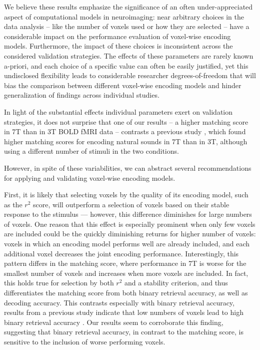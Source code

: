 We believe these results emphasize the significance of an often under-appreciated aspect of computational models in neuroimaging: near arbitrary choices in the data analysis -- like the number of voxels used or how they are selected -- have a considerable impact on the performance evaluation of voxel-wise encoding models. Furthermore, the impact of these choices is inconsistent across the considered validation strategies. The effects of these parameters are rarely known a-priori, and each choice of a specific value can often be easily justified, yet this undisclosed flexibility leads to considerable researcher degrees-of-freedom \citep{SNS11,hong2019false} that will bias the comparison between different voxel-wise encoding models and hinder generalization of findings across individual studies.

In light of the substantial effects individual parameters exert on validation strategies, it does not surprise that one of our results -- a higher matching score in 7T than in 3T BOLD fMRI data -- contrasts a  previous study \citep{SF14}, which found higher matching scores for encoding natural sounds in 7T than in 3T, although using a different number of stimuli in the two conditions.

However, in spite of these variabilities, we can abstract several recommendations for applying and validating voxel-wise encoding models.

First, it is likely that selecting voxels by the quality of its encoding model, such as the $r^{2}$ score, will outperform a selection of voxels based on their stable response to the stimulus --- however, this difference diminishes for large numbers of voxels. One reason that this effect is especially prominent when only few voxels are included could be the quickly diminishing returns for higher number of voxels: voxels in which  an encoding model performs well are already included, and each additional voxel decreases the joint encoding performance. Interestingly, this pattern differs in the matching score, where performance in 7T is worse for the smallest number of voxels and increases when more voxels are included. In fact, this holds true for selection by both $r^{2}$ and a stability criterion, and thus differentiates the matching score from both binary retrieval accuracy, as well as decoding accuracy. This contrasts especially with binary retrieval accuracy, results from a previous study indicate that low numbers of voxels lead to high binary retrieval accuracy \citep{hoefle2018identifying}. Our results seem to corroborate this finding, suggesting that binary retrieval accuracy, in contrast to the matching score, is sensitive to the inclusion of worse performing voxels.

